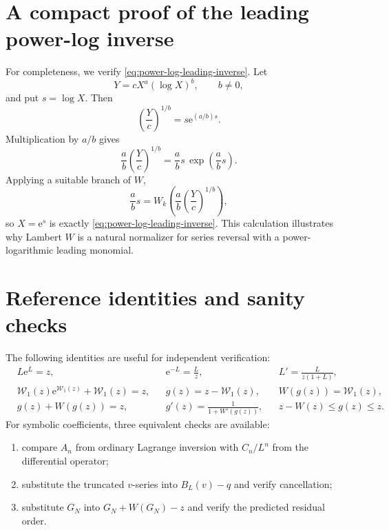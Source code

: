 \documentclass[11pt,a4paper]{article}
\numberwithin{equation}{section}
\theoremstyle{definition}
\theoremstyle{remark}
\newcommand{\e}{\mathrm e}
\newcommand{\rW}{\mathcal W}
\newcommand{\Acoef}{A}
\newcommand{\Ccoef}{C}
\begin{document}
\section{A compact proof of the leading power-log inverse}

For completeness, we verify \eqref{eq:power-log-leading-inverse}.  Let
\[
  Y=cX^a(\log X)^b,
  \qquad b\ne0,
\]
and put \(s=\log X\).  Then
\[
  \left(\frac{Y}{c}\right)^{1/b}=s\e^{(a/b)s}.
\]
Multiplication by \(a/b\) gives
\[
  \frac ab\left(\frac{Y}{c}\right)^{1/b}
  =\frac ab s\,\exp\!\left(\frac ab s\right).
\]
Applying a suitable branch of \(W\),
\[
  \frac ab s=W_k\!\left(
  \frac ab\left(\frac{Y}{c}\right)^{1/b}\right),
\]
so \(X=\e^s\) is exactly \eqref{eq:power-log-leading-inverse}.  This
calculation illustrates why Lambert \(W\) is a natural normalizer for
series reversal with a power-logarithmic leading monomial.

\section{Reference identities and sanity checks}

The following identities are useful for independent verification:
\begin{align}
 &L\e^L=z,
 &&\e^{-L}=\frac{L}{z},
 &&L'=\frac{L}{z(1+L)},
 \label{eq:check-L}\\
 &\rW_1(z)\e^{\rW_1(z)}+\rW_1(z)=z,
 &&g(z)=z-\rW_1(z),
 &&W(g(z))=\rW_1(z),
 \label{eq:check-rW}\\
 &g(z)+W(g(z))=z,
 &&g'(z)=\frac1{1+W'(g(z))},
 &&z-W(z)\le g(z)\le z.
 \label{eq:check-g}
\end{align}
For symbolic coefficients, three equivalent checks are available:
\begin{enumerate}
\item compare \(\Acoef_n\) from ordinary Lagrange inversion with
      \(\Ccoef_n/L^n\) from the differential operator;
\item substitute the truncated \(v\)-series into
      \(B_L(v)-q\) and verify cancellation;
\item substitute \(G_N\) into \(G_N+W(G_N)-z\) and verify the predicted
      residual order.
\end{enumerate}
\end{document}
